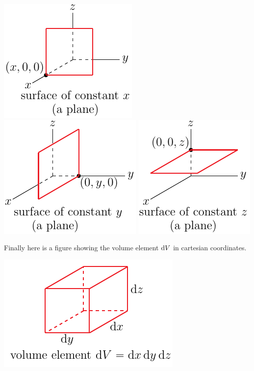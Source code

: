 \begin{wfig}
\begin{center}
    \includegraphics{cart3.pdf}\qquad
    \includegraphics{cart4.pdf}\qquad
    \includegraphics{cart2.pdf}
\end{center}
\end{wfig}
Finally here is a figure showing the volume element $\mathrm{d}V$ in
cartesian coordinates.
\begin{efig}
\begin{center}
    \includegraphics{cart5.pdf}
\end{center}
\end{efig}



